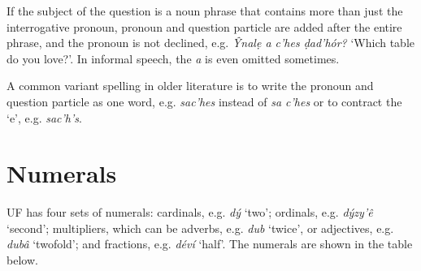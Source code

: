\documentclass[a4paper, 12pt, twoside, openright, final]{book}
\let \w \textit
\begin{document}
If the subject of the question is a noun phrase that contains more than just the interrogative pronoun,
pronoun and question particle are added after the entire phrase, and the pronoun is not declined, e.g.
\w{Ŷnalẹ a c’hes ḍad’hór?} ‘Which table do you love?’. In informal speech, the \w{a} is even omitted
sometimes.

A common variant spelling in older literature is to write the pronoun and question particle as one
word, e.g. \w{sac’hes} instead of \w{sa c’hes} or to contract the ‘e’, e.g. \w{sac’h’s}.

\section{Numerals}\label{subsec:numerals}
UF has four sets of numerals: cardinals, e.g. \w{dý} ‘two’; ordinals, e.g. \w{dýzy’ê} ‘second’; multipliers, which can
be adverbs, e.g. \w{dub} ‘twice’, or adjectives, e.g. \w{dubâ} ‘twofold’; and fractions, e.g. \w{déví} ‘half’. The numerals
are shown in the table below.
\end{document}
